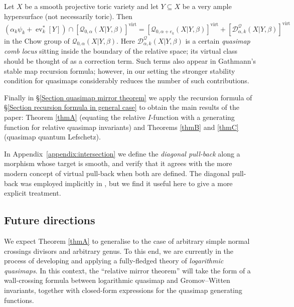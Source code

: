 \documentclass[10pt]{amsart}
\newcommand{\Q}[4]{\mathcal{Q}_{#1,#2}(#3,#4)}
\newcommand{\Gm}{\mathbb{G}_{\text{m}}}
\newcommand{\virt}[1]{[#1]^{\operatorname{virt}}}
\newcommand{\ev}{\operatorname{ev}}
\newcommand{\om}[1]{\mathcal{#1}}
\theoremstyle{definition}
\newenvironment{customthm}[1]
  {\renewcommand\theinnercustomthm{#1}\innercustomthm}
  {\endinnercustomthm}
\theoremstyle{definition}
\begin{document}
\begin{customthm}{\ref{Theorem general recursion}} Let $X$ be a smooth projective toric variety and let $Y \subseteq X$ be a very ample hypersurface (not necessarily toric). Then
\begin{equation*} (\alpha_k \psi_k + \ev_k^* [Y]) \cap \virt{\Q{0}{\alpha}{X|Y}{\beta}} = \virt{\Q{0}{\alpha+e_k}{X|Y}{\beta}} + \virt{\mathcal D^\mathcal{Q}_{\alpha,k}(X|Y,\beta)} \end{equation*}
in the Chow group of $\Q{0}{\alpha}{X|Y}{\beta}$. 
\end{customthm}
\noindent Here $\mathcal D^\mathcal{Q}_{\alpha,k}(X|Y,\beta)$ is a certain \emph{quasimap comb locus} sitting inside the boundary of the relative space; its virtual class should be thought of as a correction term. Such terms also appear in Gathmann's stable map recursion formula; however, in our setting the stronger stability condition for quasimaps considerably reduces the number of such contributions.

Finally in \S \ref{Section quasimap mirror theorem} we apply the recursion formula of \S \ref{Section recursion formula in general case} to obtain the main results of the paper: Theorem \ref{thmA} (equating the relative $I$-function with a generating function for relative quasimap invariants) and Theorems \ref{thmB} and \ref{thmC} (quasimap quantum Lefschetz).

In Appendix~\ref{appendix:intersection} we define the \emph{diagonal pull-back} along a morphism whose target is smooth, and verify that it agrees with the more modern concept of virtual pull-back \cite{Manolache-Pull} when both are defined. The diagonal pull-back was employed implicitly in \cite{Ga}, but we find it useful here to give a more explicit treatment.

\subsection{Future directions}
We expect Theorem \ref{thmA} to generalise to the case of arbitrary simple normal crossings divisors and arbitrary genus. To this end, we are currently in the process of developing and applying a fully-fledged theory of \emph{logarithmic quasimaps}. In this context, the ``relative mirror theorem'' will take the form of a wall-crossing formula between logarithmic quasimap and Gromov--Witten invariants, together with closed-form expressions for the quasimap generating functions.
\end{document}
